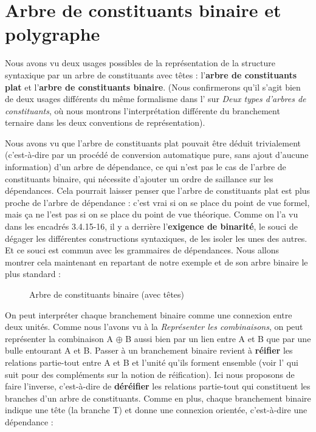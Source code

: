 \section{Arbre de constituants binaire et polygraphe}\label{sec:3.4.21}

Nous avons vu deux usages possibles de la représentation de la structure syntaxique par un arbre de constituants avec têtes : l’\textbf{arbre de constituants plat} et l’\textbf{arbre de constituants binaire}. (Nous confirmerons qu’il s’agit bien de deux usages différents du même formalisme dans l’ sur \textit{Deux types d’arbres de constituants}, où nous montrons l’interprétation différente du branchement ternaire dans les deux conventions de représentation).

Nous avons vu que l’arbre de constituants plat pouvait être déduit trivialement (c’est-à-dire par un procédé de conversion automatique pure, sans ajout d’aucune information) d’un arbre de dépendance, ce qui n’est pas le cas de l’arbre de constituants binaire, qui nécessite d’ajouter un ordre de saillance sur les dépendances. Cela pourrait laisser penser que l’arbre de constituants plat est plus proche de l’arbre de dépendance : c’est vrai si on se place du point de vue formel, mais ça ne l’est pas si on se place du point de vue théorique. Comme on l’a vu dans les encadrés 3.4.15-16, il y a derrière l’\textbf{exigence de binarité}, le souci de dégager les différentes constructions syntaxiques, de les isoler les unes des autres. Et ce souci est commun avec les grammaires de dépendances. Nous allons montrer cela maintenant en repartant de notre exemple et de son arbre binaire le plus standard :

\begin{figure}

\caption{\label{fig:}Arbre de constituants binaire (avec têtes)}

\end{figure}

On peut interpréter chaque branchement binaire comme une connexion entre deux unités. Comme nous l’avons vu à la  \textit{Représenter les combinaisons}, on peut représenter la combinaison A ${\oplus}$ B aussi bien par un lien entre A et B que par une bulle entourant A et B. Passer à un branchement binaire revient à \textbf{réifier} les relations partie-tout entre A et B et l’unité qu’ils forment ensemble (voir l’ qui suit pour des compléments sur la notion de réification). Ici nous proposons de faire l’inverse, c’est-à-dire de \textbf{déréifier} les relations partie-tout qui constituent les branches d’un arbre de constituants. Comme en plus, chaque branchement binaire indique une tête (la branche T) et donne une connexion orientée, c’est-à-dire une dépendance :

